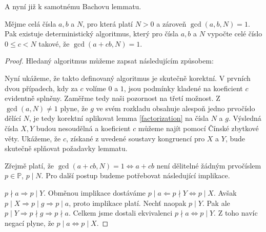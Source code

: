 A nyní již k samotnému Bachovu lemmatu.
\begin{lem} [Bach] \label{bach}
    Mějme celá čísla $ a, b $ a $ N $, pro která platí $ N > 0 $ a zároveň \newline
    $ \gcd(a,b,N) = 1 $. Pak existuje deterministický algoritmus, který pro
    čísla $ a, b $ a $ N $ vypočte celé číslo $ 0 \leq c < N $ takové, že
    $ \gcd(a + cb,N) = 1 $.
\end{lem}
\begin{proof}
Hledaný algoritmus můžeme zapsat následujícím způsobem:\\
    \begin{algorithm}[H] \label{Bach_Algo}
    \end{algorithm}
Nyní ukážeme, že takto definovaný algoritmus je skutečně korektní. V prvních
dvou případech, kdy za $ c $ volíme $ 0 $ a $ 1 $, jsou podmínky
kladené na koeficient $ c $ evidentně splněny. Zaměřme tedy naši pozornost na třetí
možnost. Z $ \gcd(a,N) \neq 1 $ plyne, že $ g $ ve svém rozkladu obsahuje
alespoň jedno prvočíslo dělící $ N $, je tedy korektní aplikovat lemma
\ref{factorization} na čísla $ N $ a $ g $. Výsledná čísla $ X, Y $ budou
nesoudělná a koeficient $ c $ můžeme najít pomocí Čínské zbytkové věty. Ukážeme,
že $ c $, získané z uvedené soustavy kongruencí pro $ X $ a $ Y $, bude skutečně
splňovat požadavky lemmatu.

Zřejmě platí, že $ \gcd(a+cb, N) = 1 \Leftrightarrow a + cb $ není dělitelné žádným
prvočíslem $ p \in \mathbb{P}$, $p \mid N $. Pro další postup budeme potřebovat
následující implikace.

$ p \nmid a \Rightarrow p \mid Y $. Obměnou implikace dostáváme
$ p \mid a \Leftarrow p \nmid Y \Leftrightarrow p \mid X $. Avšak
$ p \mid X \Rightarrow p \mid g \Rightarrow p \mid a $, proto implikace platí.
Nechť naopak $ p \mid Y $. Pak ale
$ p \mid Y \Rightarrow p \nmid g \Rightarrow p \nmid a $. Celkem jsme dostali
ekvivalenci $ p \nmid a \Leftrightarrow p \mid Y $. Z toho navíc negací plyne, že
$ p \mid a \Leftrightarrow p \mid X $.


\end{proof}
